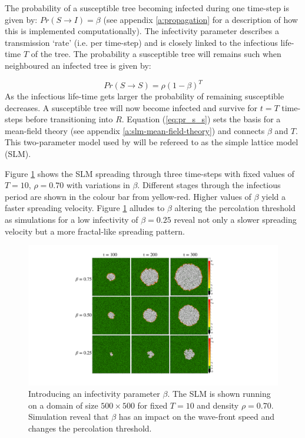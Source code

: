 The probability of a susceptible tree becoming infected during one time-step is given by: %
$Pr(S \rightarrow I) = \beta$ (see appendix \ref{a:propagation} for a description of how this is implemented computationally). %
The infectivity parameter describes a transmission `rate' (i.e. per time-step) and is closely linked to the infectious life-time $T$ of the tree. %
The probability a susceptible tree will remains such  when neighboured an infected tree is given by:

\begin{equation}
\label{eq:pr_s_s}
    Pr(S \rightarrow S) = \rho(1 -\beta)^T
\end{equation}
As the infectious life-time gets larger the probability of remaining susceptible decreases. %
A susceptible tree will now become infected and survive for $t=T$ time-steps before transitioning into $R$. %
Equation (\ref{eq:pr_s_s}) sets the basis for a mean-field theory (see appendix \ref{a:slm-mean-field-theory}) and connects $\beta$ and $T$. %
This two-parameter model used by \cite{OROZCOFUENTES201912} will be refereed to as the simple lattice model (SLM). 

Figure \ref{fig:slm} shows the SLM spreading through three time-steps with fixed values of $T=10$, $\rho=0.70$ with variations in $\beta$. %
Different stages through the infectious period are shown in the colour bar from yellow-red. %
Higher values of $\beta$ yield a faster spreading velocity. %
Figure \ref{fig:slm} alludes to $\beta$ altering the percolation threshold as simulations for a low infectivity of $\beta=0.25$ reveal not only a slower spreading velocity but a more fractal-like spreading pattern. %

\begin{figure}
    \centering
    \includegraphics[scale=0.4]{chapter3/figures/figure5.pdf}
    \caption{Introducing an infectivity parameter $\beta$. The SLM is shown running on a domain of size $500\times500$ for fixed $T=10$ and density $\rho=0.70$. Simulation reveal that $\beta$ has an impact on the wave-front speed and changes the percolation threshold.}
    \label{fig:slm}
\end{figure}

